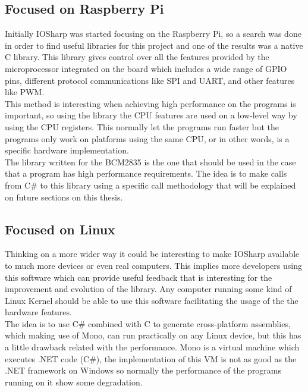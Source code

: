 \subsection{Focused on Raspberry Pi}\label{SS:IOSharp-RPI}
Initially IOSharp was started focusing on the Raspberry Pi, so a search was done in order to find useful libraries for this project and one of the results was a native C library. This library gives control over all the features provided by the microprocessor integrated on the board which includes a wide range of \gls{GPIO} pins, different protocol communications like \gls{SPI} and \gls{UART}, and other features like \gls{PWM}.
\\
This method is interesting when achieving high performance on the programs is important, so using the library the CPU features are used on a low-level way by using the CPU registers. This normally let the programs run faster but the programs only work on platforms using the same CPU, or in other words, is a specific hardware implementation.
\\
The library written for the \gls{BCM2835} is the one that should be used in the case that a program has high performance requirements. The idea is to make calls from C\# to this library using a specific call methodology that will be explained on future sections on this thesis.

\subsection{Focused on Linux}\label{SS:IOSharp-Linux}
Thinking on a more wider way it could be interesting to make IOSharp available to much more devices or even real computers. This implies more developers using this software which can provide useful feedback that is interesting for the improvement and evolution of the library. Any computer running some kind of Linux Kernel should be able to use this software facilitating the usage of the the hardware features.
\\
The idea is to use C\# combined with C to generate cross-platform assemblies, which making use of Mono, can run practically on any Linux device, but this has a little drawback related with the performance. Mono is a virtual machine which executes .NET code (C\#), the implementation of this VM is not as good as the .NET framework on Windows so normally the performance of the programs running on it show some degradation.

